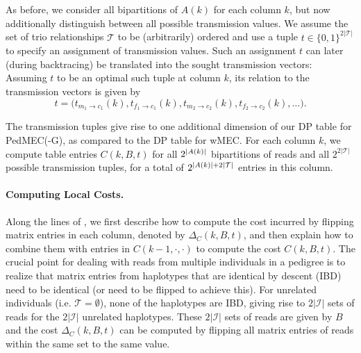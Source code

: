 As before, we consider all bipartitions of $A(k)$ for each column $k$, but now additionally distinguish between all possible transmission values.
We assume the set of trio relationships $\mathcal{T}$ to be (arbitrarily) ordered and use a tuple $t\in\{0,1\}^{2|\mathcal{T}|}$ to specify an assignment of transmission values.
Such an assignment $t$ can later (during backtracing) be translated into the sought transmission vectors:
Assuming $t$ to be an optimal such tuple at column $k$, its relation to the transmission vectors is given by
\[t=\big(t_{m_1\to c_1}(k),t_{f_1\to c_1}(k),t_{m_2\to c_2}(k),t_{f_2\to c_2}(k),\ldots\big).\]

The transmission tuples give rise to one additional dimension of our DP table for PedMEC(-G), as compared to the DP table for wMEC.
For each column $k$, we compute table entries $C(k,B,t)$ for all $2^{\left\lvert A(k) \right\rvert}$ bipartitions of reads and all $2^{2|\mathcal{T}|}$ possible transmission tuples, for a total of $2^{{\left\lvert A(k) \right\rvert}+2{\left\lvert \mathcal{T} \right\rvert}}$ entries in this column.

\paragraph{Computing Local Costs.}
Along the lines of \cite{Patterson2015}, we first describe how to compute the cost incurred by flipping matrix entries in each column, denoted by $\Delta_C(k,B,t)$, and then explain how to combine them with entries in $C(k-1,\cdot,\cdot)$ to compute the cost $C(k,B,t)$.
The crucial point for dealing with reads from multiple individuals in a pedigree is to realize that matrix entries from haplotypes that are identical by descent (IBD) need to be identical (or need to be flipped to achieve this).
For unrelated individuals (i.e. $\mathcal{T}=\emptyset$), none of the haplotypes are IBD, giving rise to $2|\mathcal{I}|$ sets of reads for the $2|\mathcal{I}|$ unrelated haplotypes.
These $2|\mathcal{I}|$ sets of reads are given by $B$ and the cost $\Delta_C(k,B,t)$ can be computed by flipping all matrix entries of reads within the same set to the same value.

